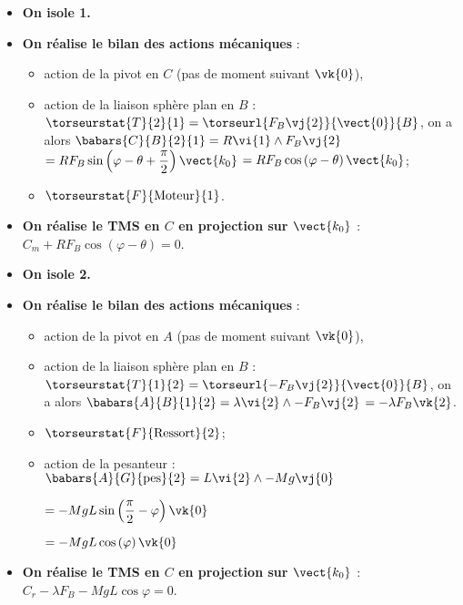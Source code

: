 \ifprof
\begin{itemize}
\item \textbf{On isole 1.}
\item \textbf{On réalise le bilan des actions mécaniques} : 
\begin{itemize}
\item action de la pivot en $C$ (pas de moment suivant $\vk{0}$),
\item action de la liaison sphère plan en $B$ : $\torseurstat{T}{2}{1} = \torseurl{F_B \vj{2}}{\vect{0}}{B}$, on a alors 
$\babars{C}{B}{2}{1} = R\vi{1}\wedge F_B \vj{2}$
$= RF_B \sin \left(\varphi - \theta + \dfrac{\pi}{2}\right)\vect{k_0}$
$= RF_B \cos \left(\varphi - \theta \right)\vect{k_0}$;
\item $\torseurstat{F}{\text{Moteur}}{1}$.
\end{itemize}
\item \textbf{On réalise le TMS en $C$ en projection sur $\vect{k_0}$} :
$C_m +RF_B \cos \left(\varphi - \theta \right) = 0$.
\end{itemize}


\begin{itemize}
\item \textbf{On isole 2.}
\item \textbf{On réalise le bilan des actions mécaniques} : 
\begin{itemize}
\item action de la pivot en $A$ (pas de moment suivant $\vk{0}$),
\item action de la liaison sphère plan en $B$ : $\torseurstat{T}{1}{2} = \torseurl{-F_B \vj{2}}{\vect{0}}{B}$, on a alors 
$\babars{A}{B}{1}{2} =  \lambda\vi{2}\wedge -F_B \vj{2}$
$=-\lambda F_B \vk{2}$.
\item $\torseurstat{F}{\text{Ressort}}{2}$;
\item action de la pesanteur : 
$\babars{A}{G}{\text{pes}}{2} = L \vi{2} \wedge -Mg \vj{0} $

$= -MgL \sin \left(\dfrac{\pi}{2}-\varphi\right) \vk{0} $

$= -MgL \cos \left(\varphi\right) \vk{0} $

\end{itemize}
\item \textbf{On réalise le TMS en $C$ en projection sur $\vect{k_0}$} :
$C_r-\lambda F_B  -MgL \cos \varphi= 0$.
\end{itemize}


